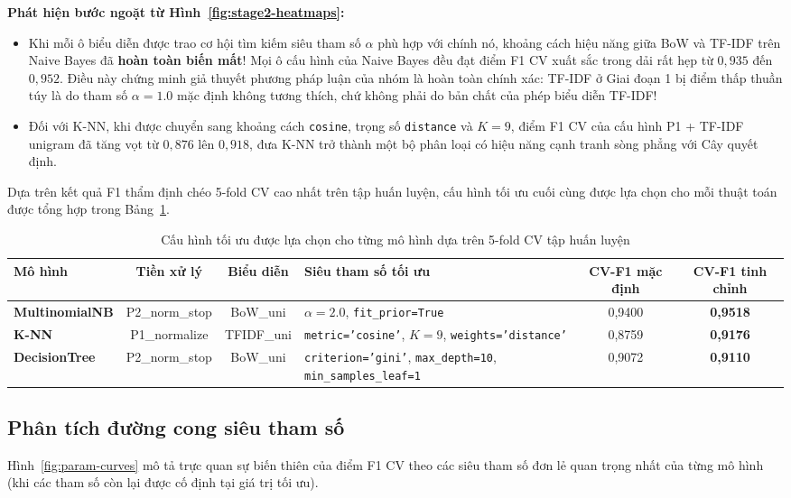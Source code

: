 \textbf{Phát hiện bước ngoặt từ Hình~\ref{fig:stage2-heatmaps}:}
\begin{itemize}
    \item Khi mỗi ô biểu diễn được trao cơ hội tìm kiếm siêu tham số $\alpha$ phù hợp với chính nó, khoảng cách hiệu năng giữa BoW và TF-IDF trên Naive Bayes đã \textbf{hoàn toàn biến mất}! Mọi ô cấu hình của Naive Bayes đều đạt điểm F1 CV xuất sắc trong dải rất hẹp từ $0,935$ đến $0,952$. Điều này chứng minh giả thuyết phương pháp luận của nhóm là hoàn toàn chính xác: TF-IDF ở Giai đoạn 1 bị điểm thấp thuần túy là do tham số $\alpha=1.0$ mặc định không tương thích, chứ không phải do bản chất của phép biểu diễn TF-IDF!
    \item Đối với K-NN, khi được chuyển sang khoảng cách \texttt{cosine}, trọng số \texttt{distance} và $K=9$, điểm F1 CV của cấu hình P1 + TF-IDF unigram đã tăng vọt từ $0,876$ lên \textbf{$0,918$}, đưa K-NN trở thành một bộ phân loại có hiệu năng cạnh tranh sòng phẳng với Cây quyết định.
\end{itemize}

Dựa trên kết quả F1 thẩm định chéo 5-fold CV cao nhất trên tập huấn luyện, cấu hình tối ưu cuối cùng được lựa chọn cho mỗi thuật toán được tổng hợp trong Bảng~\ref{tab:cau-hinh-toi-uu}.

\begin{table}[H]
\centering
\caption{Cấu hình tối ưu được lựa chọn cho từng mô hình dựa trên 5-fold CV tập huấn luyện}
\label{tab:cau-hinh-toi-uu}
\begin{tabular}{|l|c|c|p{4.2cm}|c|c|}
\hline
\textbf{Mô hình} & \textbf{Tiền xử lý} & \textbf{Biểu diễn} & \textbf{Siêu tham số tối ưu} & \textbf{CV-F1 mặc định} & \textbf{CV-F1 tinh chỉnh} \\
\hline
\textbf{MultinomialNB} & P2\_norm\_stop & BoW\_uni & $\alpha=2.0$, \texttt{fit\_prior=True} & 0,9400 & \textbf{0,9518} \\
\hline
\textbf{K-NN} & P1\_normalize & TFIDF\_uni & \texttt{metric='cosine'}, $K=9$, \texttt{weights='distance'} & 0,8759 & \textbf{0,9176} \\
\hline
\textbf{DecisionTree} & P2\_norm\_stop & BoW\_uni & \texttt{criterion='gini'}, \texttt{max\_depth=10}, \texttt{min\_samples\_leaf=1} & 0,9072 & \textbf{0,9110} \\
\hline
\end{tabular}
\end{table}

\subsection{Phân tích đường cong siêu tham số}
Hình~\ref{fig:param-curves} mô tả trực quan sự biến thiên của điểm F1 CV theo các siêu tham số đơn lẻ quan trọng nhất của từng mô hình (khi các tham số còn lại được cố định tại giá trị tối ưu).

